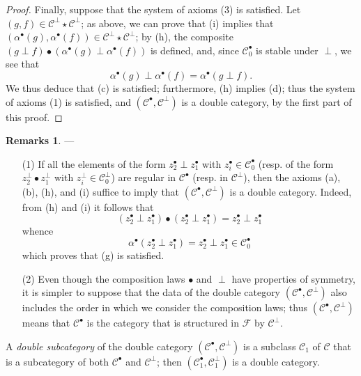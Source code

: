 \documentclass[a4paper,fleqn]{article}
\theoremstyle{plain}
\theoremstyle{definition}
\newtheorem*{remarks}{Remarks}
\newcommand{\oldpage}[1]{{\marginpar{\footnotesize$\bigg\vert$\,\,\,\,\textit{p.~#1}}}}
\newcommand{\CC}{\mathcal{C}}
\newcommand{\FF}{\mathcal{F}}
\newcommand{\smallbullet}{\bullet}
\begin{document}
\begin{proof}
  Finally, suppose that the system of axioms (3) is satisfied.
  Let $(g,f)\in\CC^\perp\star\CC^\perp$;
  as above, we can prove that (i) implies that $(\alpha^\smallbullet(g),\alpha^\smallbullet(f))\in\CC^\perp\star\CC^\perp$;
  by (h), the composite $(g\perp f)\smallbullet(\alpha^\smallbullet(g)\perp\alpha^\smallbullet(f))$ is defined, and, since $\CC_0^\smallbullet$ is stable under $\perp$, we see that
  \[
    \alpha^\smallbullet(g)\perp\alpha^\smallbullet(f)
    = \alpha^\smallbullet(g\perp f).
  \]
  We thus deduce that (c) is satisfied;
  furthermore, (h) implies (d);
  thus the system of axioms (1) is satisfied, and $(\CC^\smallbullet,\CC^\perp)$ is a double category, by the first part of this proof.
\end{proof}

\begin{remarks}
  ---
  \begin{enumerate}
    \item[\normalfont(1)]
      If all the elements of the form $z_2^\smallbullet\perp z_1^\smallbullet$ with $z_i^\smallbullet\in\CC_0^\smallbullet$ (resp. of the form $z_2^\perp\smallbullet z_1^\perp$ with $z_i^\perp\in\CC_0^\perp$) are regular \cite{3a} in $\CC^\smallbullet$ (resp. in $\CC^\perp$), then the axioms (a), (b), (h), and (i) suffice to imply that $(\CC^\smallbullet,\CC^\perp)$ is a double category.
      Indeed, from (h) and (i) it follows that
      \[
        (z_2^\smallbullet\perp z_1^\smallbullet)\smallbullet(z_2^\smallbullet\perp z_1^\smallbullet)
        = z_2^\smallbullet\perp z_1^\smallbullet
      \]
      whence
      \[
        \alpha^\smallbullet(z_2^\smallbullet\perp z_1^\smallbullet)
        = z_2^\smallbullet\perp z_1^\smallbullet
        \in\CC_0^\smallbullet
      \]
      which proves that (g) is satisfied.

    \item[\normalfont(2)]
      \oldpage{393}
      Even though the composition laws $\smallbullet$ and $\perp$ have properties of symmetry, it is simpler to suppose that the data of the double category $(\CC^\smallbullet,\CC^\perp)$ also includes the order in which we consider the composition laws;
      thus $(\CC^\smallbullet,\CC^\perp)$ means that $\CC^\smallbullet$ is the category that is structured in $\FF$ by $\CC^\perp$.
  \end{enumerate}
\end{remarks}

A \emph{double subcategory} of the double category $(\CC^\smallbullet,\CC^\perp)$ is a subclass $\CC_1$ of $\CC$ that is a subcategory of both $\CC^\smallbullet$ and $\CC^\perp$;
then $(\CC_1^\smallbullet,\CC_1^\perp)$ is a double category.
\end{document}
